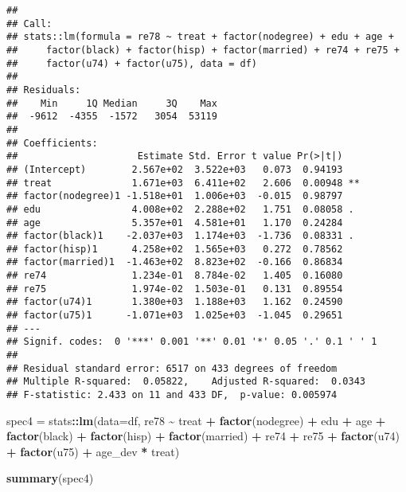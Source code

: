 \documentclass[
]{article}
\newenvironment{Shaded}{\begin{snugshade}}{\end{snugshade}}
\newcommand{\AttributeTok}[1]{\textcolor[rgb]{0.13,0.29,0.53}{#1}}
\newcommand{\FunctionTok}[1]{\textcolor[rgb]{0.13,0.29,0.53}{\textbf{#1}}}
\newcommand{\NormalTok}[1]{#1}
\newcommand{\OtherTok}[1]{\textcolor[rgb]{0.56,0.35,0.01}{#1}}
\newcommand{\SpecialCharTok}[1]{\textcolor[rgb]{0.81,0.36,0.00}{\textbf{#1}}}
\begin{document}
\begin{verbatim}
## 
## Call:
## stats::lm(formula = re78 ~ treat + factor(nodegree) + edu + age + 
##     factor(black) + factor(hisp) + factor(married) + re74 + re75 + 
##     factor(u74) + factor(u75), data = df)
## 
## Residuals:
##    Min     1Q Median     3Q    Max 
##  -9612  -4355  -1572   3054  53119 
## 
## Coefficients:
##                     Estimate Std. Error t value Pr(>|t|)   
## (Intercept)        2.567e+02  3.522e+03   0.073  0.94193   
## treat              1.671e+03  6.411e+02   2.606  0.00948 **
## factor(nodegree)1 -1.518e+01  1.006e+03  -0.015  0.98797   
## edu                4.008e+02  2.288e+02   1.751  0.08058 . 
## age                5.357e+01  4.581e+01   1.170  0.24284   
## factor(black)1    -2.037e+03  1.174e+03  -1.736  0.08331 . 
## factor(hisp)1      4.258e+02  1.565e+03   0.272  0.78562   
## factor(married)1  -1.463e+02  8.823e+02  -0.166  0.86834   
## re74               1.234e-01  8.784e-02   1.405  0.16080   
## re75               1.974e-02  1.503e-01   0.131  0.89554   
## factor(u74)1       1.380e+03  1.188e+03   1.162  0.24590   
## factor(u75)1      -1.071e+03  1.025e+03  -1.045  0.29651   
## ---
## Signif. codes:  0 '***' 0.001 '**' 0.01 '*' 0.05 '.' 0.1 ' ' 1
## 
## Residual standard error: 6517 on 433 degrees of freedom
## Multiple R-squared:  0.05822,    Adjusted R-squared:  0.0343 
## F-statistic: 2.433 on 11 and 433 DF,  p-value: 0.005974
\end{verbatim}

\begin{Shaded}
\end{Shaded}

\begin{Shaded}
\begin{Highlighting}[]
\NormalTok{spec4 }\OtherTok{=}\NormalTok{ stats}\SpecialCharTok{::}\FunctionTok{lm}\NormalTok{(}\AttributeTok{data=}\NormalTok{df, re78 }\SpecialCharTok{\textasciitilde{}}\NormalTok{ treat }\SpecialCharTok{+} \FunctionTok{factor}\NormalTok{(nodegree) }\SpecialCharTok{+}\NormalTok{ edu }\SpecialCharTok{+}\NormalTok{ age }\SpecialCharTok{+} \FunctionTok{factor}\NormalTok{(black) }\SpecialCharTok{+} \FunctionTok{factor}\NormalTok{(hisp) }\SpecialCharTok{+} \FunctionTok{factor}\NormalTok{(married) }\SpecialCharTok{+}\NormalTok{ re74 }\SpecialCharTok{+}\NormalTok{ re75 }\SpecialCharTok{+} \FunctionTok{factor}\NormalTok{(u74) }\SpecialCharTok{+} \FunctionTok{factor}\NormalTok{(u75) }\SpecialCharTok{+}\NormalTok{ age\_dev }\SpecialCharTok{*}\NormalTok{ treat)}

\FunctionTok{summary}\NormalTok{(spec4)}
\end{Highlighting}
\end{Shaded}
\end{document}

